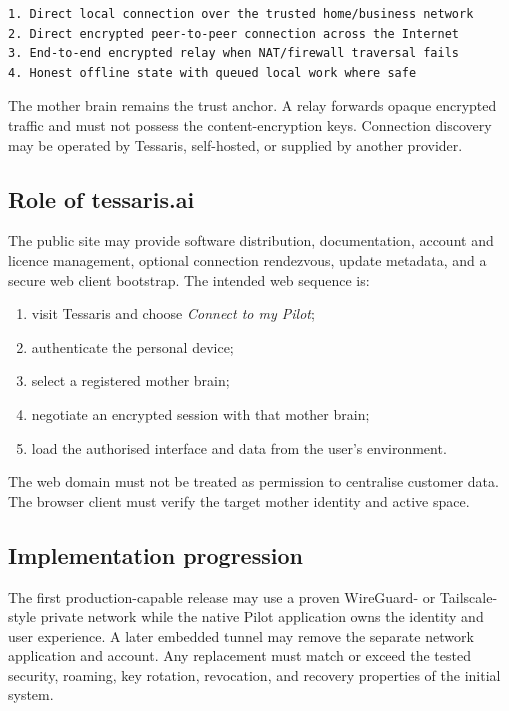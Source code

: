 \documentclass[11pt,a4paper]{article}
\begin{document}
\begin{lstlisting}[style=pilotcode]
1. Direct local connection over the trusted home/business network
2. Direct encrypted peer-to-peer connection across the Internet
3. End-to-end encrypted relay when NAT/firewall traversal fails
4. Honest offline state with queued local work where safe
\end{lstlisting}

The mother brain remains the trust anchor.  A relay forwards opaque encrypted
traffic and must not possess the content-encryption keys.  Connection discovery
may be operated by Tessaris, self-hosted, or supplied by another provider.

\subsection{Role of tessaris.ai}

The public site may provide software distribution, documentation, account and
licence management, optional connection rendezvous, update metadata, and a
secure web client bootstrap.  The intended web sequence is:

\begin{enumerate}[leftmargin=*]
  \item visit Tessaris and choose \emph{Connect to my Pilot};
  \item authenticate the personal device;
  \item select a registered mother brain;
  \item negotiate an encrypted session with that mother brain;
  \item load the authorised interface and data from the user's environment.
\end{enumerate}

The web domain must not be treated as permission to centralise customer data.
The browser client must verify the target mother identity and active space.

\subsection{Implementation progression}

The first production-capable release may use a proven WireGuard- or
Tailscale-style private network while the native Pilot application owns the
identity and user experience.  A later embedded tunnel may remove the separate
network application and account.  Any replacement must match or exceed the
tested security, roaming, key rotation, revocation, and recovery properties of
the initial system.
\end{document}
